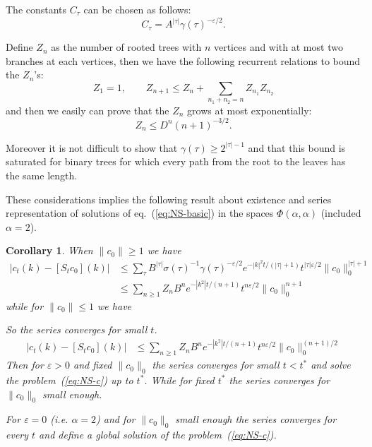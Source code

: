 \documentclass[a4paper,12pt,reqno]{amsart}
\newcommand{\1}{{\bf 1}}
\newcommand{\eps}{\varepsilon}
\newtheorem{corollary}[theorem]{Corollary}
\begin{document}
The constants $C_\tau$ can be chosen as follows:
$$
C_\tau = A^{|\tau|} \gamma(\tau)^{-\eps/2}.
$$

Define $Z_n$ as the number of  rooted trees with $n$ vertices and with
at most two branches at each vertices, then we have
the following recurrent relations to bound the $Z_n$'s:
$$
Z_1 = 1, \qquad Z_{n+1} \le Z_n +  \sum_{n_1+n_2 = n} Z_{n_1} Z_{n_2}
$$
and then we easily can prove that the $Z_n$ grows at most
exponentially:
$$
Z_n \le D^n (n+1)^{-3/2}.
$$

Moreover it is not difficult to show that $\gamma(\tau) \ge
2^{|\tau|-1}$ and that this bound is saturated for binary trees for which every path from the root to the leaves has the same length.

These considerations implies the following result about existence and
series representation of solutions of eq.~(\ref{eq:NS-basic}) in the
spaces $\Phi(\alpha,\alpha)$ (included $\alpha=2$).
\begin{corollary}
When $\|c_0\| \ge 1$  we have
\begin{equation*}
  \begin{split}
|c_t(k) - [S_t c_0](k)|& \le \sum_{\tau} B^{|\tau|} \sigma(\tau)^{-1} \gamma(\tau)^{-\eps/2}  
  e^{-|k|^2 t / (|\tau|+1)}
t^{|\tau| \eps /2} \|c_0\|_0^{|\tau|+1} 
\\ & \le \sum_{n \ge 1} Z_n B^n
e^{-|k^2| t/(n+1)} t^{n \eps/2} \|c_0\|_0^{n+1}       
  \end{split}
\end{equation*}
while for $\|c_0\|\le 1$ we have

So  the series converges for small $t$.
\begin{equation*}
  \begin{split}
|c_t(k) - [S_t c_0](k)|& \le \sum_{n \ge 1} Z_n B^n
e^{-|k^2| t/(n+1)} t^{n \eps/2} \|c_0\|_0^{(n+1)/2}       
  \end{split}
\end{equation*}
Then for $\eps > 0$ and fixed $\|c_0\|_0$ the series converges for small
$t<t^*$ and solve the problem~(\ref{eq:NS-c}) up to $t^*$.
While for fixed $t^*$ the series converges for $\|c_0\|_0$ small
enough.

For $\eps = 0$ (i.e. $\alpha =2$) and for $\|c_0\|_0$ small enough the
series converges for every $t$ and define a global solution of the
problem~(\ref{eq:NS-c}).
\end{corollary}
\end{document}
